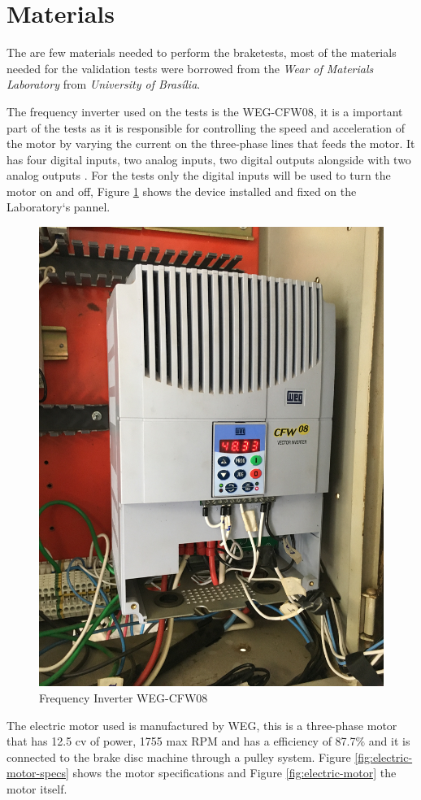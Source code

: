 \section{Materials}\label{sec:materials}
		The are few materials needed to perform the braketests, most of the materials needed for the validation tests were borrowed from the \textit{Wear of Materials Laboratory} from \textit{University of Brasília}.
		\par
		The frequency inverter used on the tests is the WEG-CFW08, it is a important part of the tests as it is responsible for controlling the speed and acceleration of the motor by varying the current on the three-phase lines that feeds the motor. It has four digital inputs, two analog inputs, two digital outputs alongside with two analog outputs \cite{wegCFW08Manual}. For the tests only the digital inputs will be used to turn the motor on and off, Figure \ref{fig:frequency-inverter} shows the device installed and fixed on the Laboratory`s pannel.

		\begin{figure}[htbp]
			\centering
			\includegraphics[width=.5\textwidth, angle=270]{figuras/fig-frequency-inverter}
			\caption{Frequency Inverter WEG-CFW08}
			\label{fig:frequency-inverter}
		\end{figure}
		\par

		The electric motor used is manufactured by WEG, this is a three-phase motor that has 12.5 cv of power, 1755 max RPM and has a efficiency of 87.7$\%$ and it is connected to the brake disc machine through a pulley system. Figure \ref{fig:electric-motor-specs} shows the motor specifications and Figure \ref{fig:electric-motor} the motor itself.

